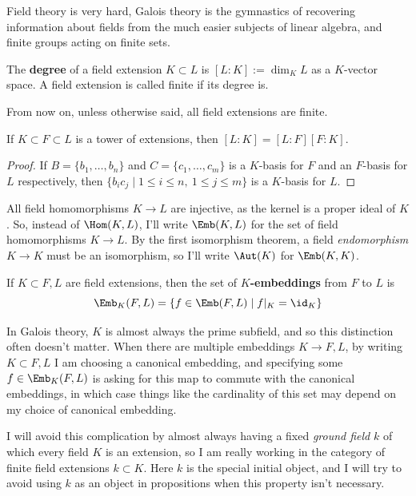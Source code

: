 \documentclass{article}
\begin{document}
Field theory is very hard, Galois theory is the gymnastics of recovering information about fields from the much easier subjects of linear algebra, and finite groups acting on finite sets.

\begin{definition}
    The \textbf{degree} of a field extension $K\subset L$ is $[L:K] := \dim_K L$ as a $K$-vector space. A field extension is called finite if its degree is.
\end{definition}

From now on, unless otherwise said, all field extensions are finite.

\begin{proposition}
    If $K\subset F \subset L$ is a tower of extensions, then $[L:K]=[L:F][F:K]$.\begin{proof}
        If $B = \{b_1,\ldots,b_n\}$ and $C=\{c_1,\ldots,c_m\}$ is a $K$-basis for $F$ and an $F$-basis for $L$ respectively, then $\{b_ic_j \mid 1\leq i \leq n, \ 1\leq j \leq m\}$ is a $K$-basis for $L$.
    \end{proof}
\end{proposition}

All field homomorphisms $K\rightarrow L$ are injective, as the kernel is a proper ideal of $K$. So, instead of $\Hom(K,L)$, I'll write $\Emb(K,L)$ for the set of field homomorphisms $K\rightarrow L$. By the first isomorphism theorem, a field \textit{endomorphism} $K\rightarrow K$ must be an isomorphism, so I'll write $\Aut(K)$ for $\Emb(K,K)$.

\begin{definition}
    If $K\subset F,L$ are field extensions, then the set of \textbf{$K$-embeddings} from $F$ to $L$ is \[
    \Emb_K(F,L) = \{f\in \Emb(F,L) \mid f\vert_K = \id_K\}
    \]
\end{definition}

In Galois theory, $K$ is almost always the prime subfield, and so this distinction often doesn't matter. When there are multiple embeddings $K\rightarrow F,L$, by writing $K\subset F,L$ I am choosing a canonical embedding, and specifying some $f\in \Emb_K(F,L)$ is asking for this map to commute with the canonical embeddings, in which case things like the cardinality of this set may depend on my choice of canonical embedding.

I will avoid this complication by almost always having a fixed \textit{ground field} $k$ of which every field $K$ is an extension, so I am really working in the category of finite field extensions $k\subset K$. Here $k$ is the special initial object, and I will try to avoid using $k$ as an object in propositions when this property isn't necessary.
\end{document}
